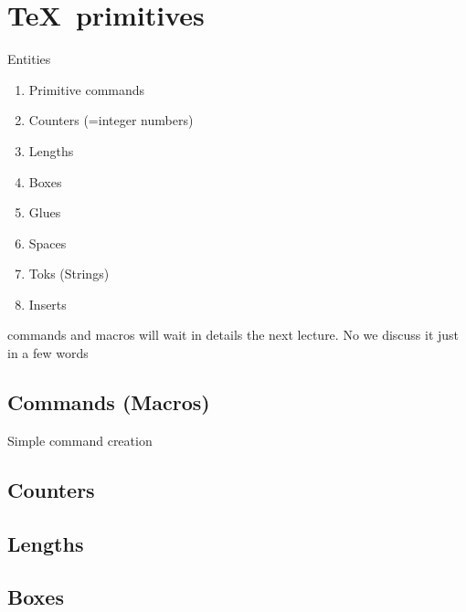 \graphicspath{{sec/images/}{sec/code/}}
\lstset{inputpath=sec/code/}

\section{\TeX\ primitives}

\begin{frame}{Entities}

    \begin{enumerate}
        \item Primitive commands
        \item Counters (=integer numbers)
        \item Lengths
        \item Boxes
        \item Glues
        \item Spaces 
        \item Toks (Strings)
        \item Inserts 
    \end{enumerate}
    \inpause
    commands and macros will wait in details the next lecture. No we discuss it just in a few words
\end{frame}

\subsection{Commands (Macros)}


\begin{frame}[fragile]{Simple command creation \lW}\relax
    
    \inpause
\end{frame}

\subsection{Counters}

\graphicspath{{sec/images/}{sec/code/}}
\lstset{inputpath=sec/code/}

\subsection{Lengths}

\subsection{Boxes}

